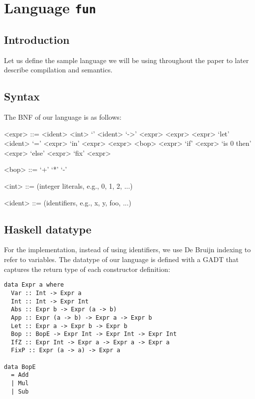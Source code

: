 \section{Language \texttt{fun}}
\subsection{Introduction}
Let us define the sample language we will be using throughout the paper to later describe compilation and semantics.
\subsection{Syntax}
The BNF of our language is as follows:

\begin{grammar}

<expr> ::= <ident>
\alt <int>
\alt `\lambda' <ident> `->' <expr>
\alt <expr> <expr>
\alt `let' <ident> `=' <expr> `in' <expr>
\alt <expr> <bop> <expr>
\alt `if' <expr> `is 0 then' <expr> `else' <expr>
\alt `fix' <expr>

<bop> ::= `+'
\alt `*'
\alt `-'

<int> ::= (integer literals, e.g., 0, 1, 2, ...)  

<ident> ::= (identifiers, e.g., x, y, foo, ...)  

\end{grammar}

\subsection{Haskell datatype}
For the implementation, instead of using identifiers, we use De Bruijn indexing to refer to variables.
The datatype of our language is defined with a GADT that captures the return type
of each constructor definition:

\begin{lstlisting}
data Expr a where
  Var :: Int -> Expr a
  Int :: Int -> Expr Int
  Abs :: Expr b -> Expr (a -> b)
  App :: Expr (a -> b) -> Expr a -> Expr b
  Let :: Expr a -> Expr b -> Expr b
  Bop :: BopE -> Expr Int -> Expr Int -> Expr Int
  IfZ :: Expr Int -> Expr a -> Expr a -> Expr a
  FixP :: Expr (a -> a) -> Expr a

data BopE
  = Add
  | Mul
  | Sub
\end{lstlisting}

